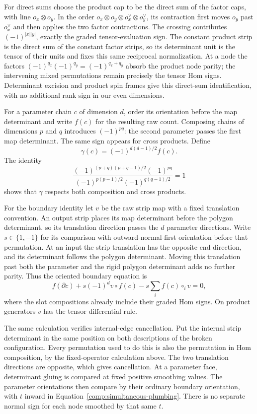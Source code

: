 \documentclass[11pt]{article}
\numberwithin{equation}{section}
\theoremstyle{definition}
\theoremstyle{remark}
\begin{document}
For direct sums choose the product cap to be the direct sum of the
factor caps, with line $o_x\otimes o_y$.  In the order
$o_x\otimes o_y\otimes o_x^\vee\otimes o_y^\vee$, its contraction
first moves $o_y$ past $o_x^\vee$ and then applies the two factor
contractions.  The crossing contributes $(-1)^{|x||y|}$, exactly
the graded tensor-evaluation sign.  The constant product strip is
the direct sum of the constant factor strips, so its determinant
unit is the tensor of their units and fixes this same reciprocal
normalization.  At a node the factors
$(-1)^{q_x}(-1)^{q_y}=(-1)^{q_x+q_y}$ absorb the product node parity;
the intervening mixed permutations remain precisely the tensor
Hom signs.  Determinant excision and product spin frames give
this direct-sum identification, with no additional rank sign in
our even dimensions.

For a parameter chain $c$ of dimension $d$, order its orientation
before the map determinant and write $f(c)$ for the resulting raw
count.  Composing chains of dimensions $p$ and $q$ introduces
$(-1)^{pq}$: the second parameter passes the first map
determinant.  The same sign appears for cross products.  Define
\begin{equation}
 \gamma(c)=(-1)^{d(d-1)/2}f(c).
 \label{comp:count-normalization}
\end{equation}
The identity
\[
 \frac{(-1)^{(p+q)(p+q-1)/2}(-1)^{pq}}
      {(-1)^{p(p-1)/2}(-1)^{q(q-1)/2}}=1
\]
shows that $\gamma$ respects both composition and cross products.

For the boundary identity let $v$ be the raw strip map with a fixed
translation convention.  An output strip places its map
determinant before the polygon determinant, so its translation
direction passes the $d$ parameter directions.  Write $s\in\{1,-1\}$
for its comparison with outward-normal-first orientation before
that permutation.  At an input the strip translation has the
opposite end direction, and its determinant follows the polygon
determinant.  Moving this translation past both the parameter and
the rigid polygon determinant adds no further parity.  Thus the
oriented boundary equation is
\begin{equation}
 f(\partial c)+s(-1)^d v\circ f(c)
       -s\sum_i f(c)\circ_i v=0,
 \label{comp:raw-boundary}
\end{equation}
where the slot compositions already include their graded Hom
signs.  On product generators $v$ has the tensor differential
rule.

The same calculation verifies internal-edge cancellation.  Put
the internal strip determinant in the same position on both
descriptions of the broken configuration.  Every permutation used
to do this is also the permutation in Hom composition, by the
fixed-operator calculation above.  The two translation directions
are opposite, which gives cancellation.  At a parameter face,
determinant gluing is compared at fixed positive smoothing values.
The parameter orientations then compare by their ordinary
boundary orientation, with $t$ inward in
Equation~\eqref{comp:simultaneous-plumbing}.  There is no separate
normal sign for each node smoothed by that same $t$.
\end{document}
